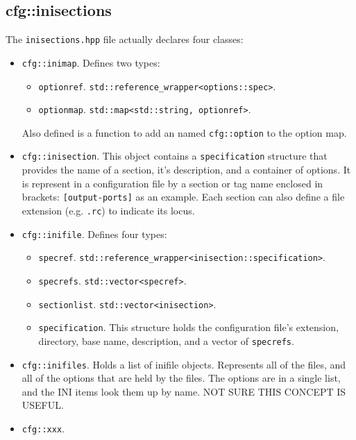\subsection{cfg::inisections}
\label{subsec:cfg_namespace_inisections}

   The \texttt{inisections.hpp} file actually declares four classes:

   \begin{itemize}
      \item \texttt{cfg::inimap}.
         Defines two types:
         \begin{itemize}
            \item \texttt{optionref}.
               \texttt{std::reference\_wrapper<options::spec>}.
            \item \texttt{optionmap}.
               \texttt{std::map<std::string, optionref>}.
         \end{itemize}
         Also defined is a function to add an named \texttt{cfg::option}
         to the option map.
      \item \texttt{cfg::inisection}.
         This object contains a \texttt{specification} structure that
         provides the name of a section, it's description, and
         a container of options.
         It is represent in a configuration file by a section or tag name
         enclosed in brackets:  \texttt{[output-ports]} as an example.
         Each section can also define a file extension
         (e.g. \texttt{.rc}) to indicate its locus.
      \item \texttt{cfg::inifile}.
         Defines four types:
         \begin{itemize}
            \item \texttt{specref}.
                \texttt{std::reference\_wrapper<inisection::specification>}.
            \item \texttt{specrefs}.
                \texttt{std::vector<specref>}.
            \item \texttt{sectionlist}.
               \texttt{std::vector<inisection>}.
            \item \texttt{specification}.
               This structure holds the configuration file's extension,
               directory, base name, description, and a vector of
               \texttt{specrefs}.
         \end{itemize}
      \item \texttt{cfg::inifiles}.
         Holds a list of inifile objects. Represents all of the files, and all of
         the options that are held by the files.  The options are in a single list,
         and the INI items look them up by name.
         NOT SURE THIS CONCEPT IS USEFUL.
      \item \texttt{cfg::xxx}.
   \end{itemize}

